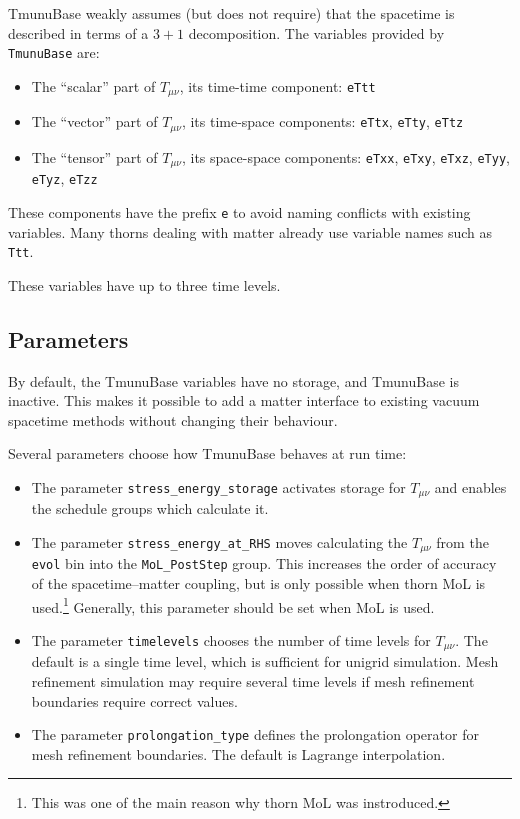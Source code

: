 \documentclass{article}
\begin{document}
TmunuBase weakly assumes (but does not require) that the spacetime is
described in terms of a $3+1$ decomposition.  The variables provided
by \texttt{TmunuBase} are:
\begin{itemize}
\item The ``scalar'' part of $T_{\mu\nu}$, its time-time component:
  \texttt{eTtt}
\item The ``vector'' part of $T_{\mu\nu}$, its time-space components:
  \texttt{eTtx}, \texttt{eTty}, \texttt{eTtz}
\item The ``tensor'' part of $T_{\mu\nu}$, its space-space components:
  \texttt{eTxx}, \texttt{eTxy}, \texttt{eTxz}, \texttt{eTyy},
  \texttt{eTyz}, \texttt{eTzz}
\end{itemize}
These components have the prefix \texttt{e} to avoid naming conflicts
with existing variables.  Many thorns dealing with matter already use
variable names such as \texttt{Ttt}.

These variables have up to three time levels.

\subsection{Parameters}

By default, the TmunuBase variables have no storage, and TmunuBase is
inactive.  This makes it possible to add a matter interface to
existing vacuum spacetime methods without changing their behaviour.

Several parameters choose how TmunuBase behaves at run time:
\begin{itemize}
\item The parameter \texttt{stress\_energy\_storage} activates storage
  for $T_{\mu\nu}$ and enables the schedule groups which calculate it.
\item The parameter \texttt{stress\_energy\_at\_RHS} moves calculating
  the $T_{\mu\nu}$ from the \texttt{evol} bin into the
  \texttt{MoL\_PostStep} group.  This increases the order of accuracy
  of the spacetime--matter coupling, but is only possible when thorn
  MoL is used.\footnote{This was one of the main reason why thorn MoL
    was instroduced.}  Generally, this parameter should be set when
  MoL is used.
\item The parameter \texttt{timelevels} chooses the number of time
  levels for $T_{\mu\nu}$.  The default is a single time level, which
  is sufficient for unigrid simulation.  Mesh refinement simulation
  may require several time levels if mesh refinement boundaries
  require correct values.
\item The parameter \texttt{prolongation\_type} defines the
  prolongation operator for mesh refinement boundaries.  The default
  is Lagrange interpolation.
\end{itemize}
\end{document}
